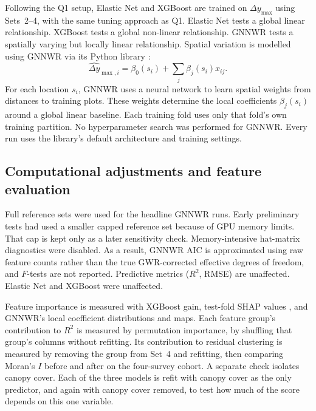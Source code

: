 Following the Q1 setup, Elastic Net and XGBoost are trained on $\Delta y_{\max}$ using Sets~2--4, with the same tuning approach as Q1. Elastic Net tests a global linear relationship. XGBoost tests a global non-linear relationship. GNNWR tests a spatially varying but locally linear relationship. Spatial variation is modelled using GNNWR via its Python library \cite{du2020Geographically_C6_GWR, du2022PyGNNWR_C6_GWR}:
\begin{equation}
\widehat{\Delta y}_{\max,i} = \beta_0(s_i) + \sum_j \beta_j(s_i) x_{ij}.
\label{eq:gnnwr}
\end{equation}
For each location $s_i$, GNNWR uses a neural network to learn spatial weights from distances to training plots. These weights determine the local coefficients $\beta_j(s_i)$ around a global linear baseline. Each training fold uses only that fold's own training partition. No hyperparameter search was performed for GNNWR. Every run uses the library's default architecture and training settings.

\subsection*{Computational adjustments and feature evaluation}
Full reference sets were used for the headline GNNWR runs. Early preliminary tests had used a smaller capped reference set because of GPU memory limits. That cap is kept only as a later sensitivity check. Memory-intensive hat-matrix diagnostics were disabled. As a result, GNNWR AIC is approximated using raw feature counts rather than the true GWR-corrected effective degrees of freedom, and $F$-tests are not reported. Predictive metrics ($R^2$, RMSE) are unaffected. Elastic Net and XGBoost were unaffected. %

Feature importance is measured with XGBoost gain, test-fold SHAP values \cite{lundberg2017Unified_C7_XAI}, and GNNWR's local coefficient distributions and maps. Each feature group's contribution to $R^2$ is measured by permutation importance, by shuffling that group's columns without refitting. Its contribution to residual clustering is measured by removing the group from Set~4 and refitting, then comparing Moran's $I$ before and after on the four-survey cohort. A separate check isolates canopy cover. Each of the three models is refit with canopy cover as the only predictor, and again with canopy cover removed, to test how much of the score depends on this one variable.

